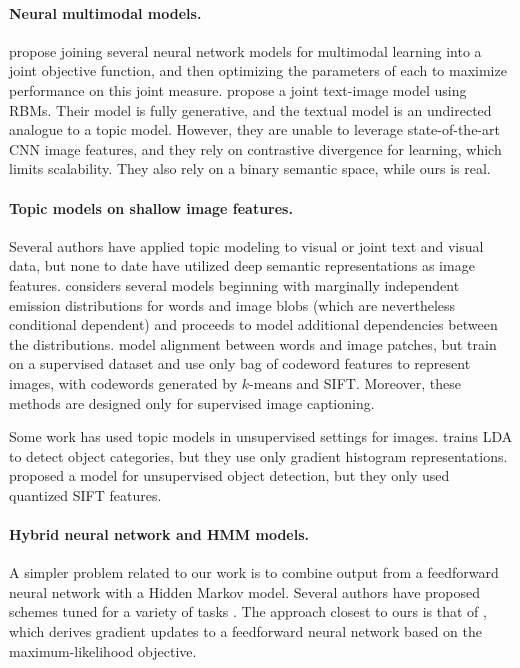 \documentclass[11pt]{article}
\begin{document}
\paragraph{Neural multimodal models.}
\cite{Lecun98} propose joining several neural network models for multimodal learning into a joint objective function, and then optimizing the parameters of each to maximize performance on this joint measure. \cite{Srivastava14} propose a joint text-image model using RBMs. Their model is fully generative, and the textual model is an undirected analogue to a topic model. However, they are unable to leverage state-of-the-art CNN image features, and they rely on contrastive divergence for learning, which limits scalability. They also rely on a binary semantic space, while ours is real.

\paragraph{Topic models on shallow image features.}
Several authors have applied topic modeling to visual or joint text and visual data, but none to date have utilized deep semantic representations as image features. \cite{Barnard03} considers several models beginning with marginally independent emission distributions for words and image blobs (which are nevertheless conditional dependent) and proceeds to model additional dependencies between the distributions. \cite{Wang09a} model alignment between words and image patches, but train on a supervised dataset and use only bag of codeword features to represent images, with codewords generated by $k$-means and SIFT. Moreover, these methods are designed only for supervised image captioning.

Some work has used topic models in unsupervised settings for images. \cite{Fritz08} trains LDA to detect object categories, but they use only gradient histogram representations. \cite{Cao07} proposed a model for unsupervised object detection, but they only used quantized SIFT features.

\paragraph{Hybrid neural network and HMM models.}
A simpler problem related to our work is to combine output from a feedforward neural network with a Hidden Markov model. Several authors have proposed schemes tuned for a variety of tasks \cite{Trentin01}. The approach closest to ours is that of \cite{Bengio92}, which derives gradient updates to a feedforward neural network based on the maximum-likelihood objective. 
\end{document}
